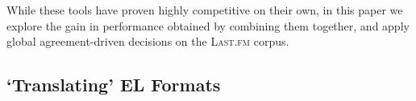 While these tools have proven highly competitive on their own, in this paper we explore the gain in performance obtained by combining them together, and apply global agreement-driven decisions on the \textsc{Last.fm} corpus.



\subsection{`Translating' EL Formats}
\label{sec:unification}

